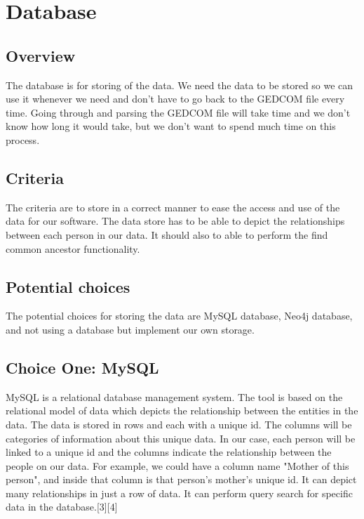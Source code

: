 \documentclass[onecolumn, draftclsnofoot, 10pt, compsoc]{IEEEtran}
\begin{document}
\section{Database}
\subsection{Overview}
\begin{singlespace}
The database is for storing of the data. We need the data to be stored so we can use it whenever we need and don't have to go back to the GEDCOM file every time. Going through and parsing the GEDCOM file will take time and we don't know how long it would take, but we don't want to spend much time on this process. 
\end{singlespace}

\subsection{Criteria}
\begin{singlespace}
The criteria are to store in a correct manner to ease the access and use of the data for our software. The data store has to be able to depict the relationships between each person in our data. It should also to able to perform the find common ancestor functionality.
\end{singlespace}

\subsection{Potential choices}
\begin{singlespace}
The potential choices for storing the data are MySQL database, Neo4j database, and not using a database but implement our own storage. 
\end{singlespace}


\subsection{Choice One: MySQL}
\begin{singlespace}
MySQL is a relational database management system. The tool is based on the relational model of data which depicts the relationship between the entities in the data. The data is stored in rows and each with a unique id. The columns will be categories of information about this unique data. In our case, each person will be linked to a unique id and the columns indicate the relationship between the people on our data. For example, we could have a column name "Mother of this person", and inside that column is that person's mother's unique id. It can depict many relationships in just a row of data. It can perform query search for specific data in the database.[3][4]
\end{singlespace}
\end{document}
